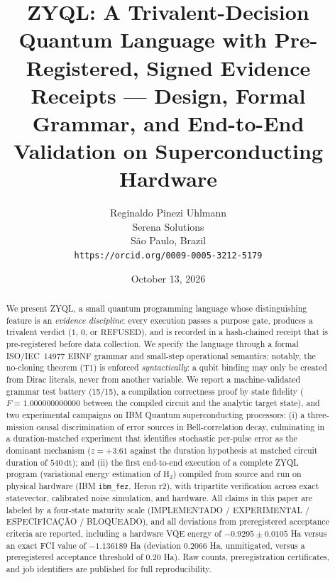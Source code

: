 \documentclass[11pt]{article}
\title{ZYQL: A Trivalent-Decision Quantum Language with Pre-Registered, Signed Evidence Receipts --- Design, Formal Grammar, and End-to-End Validation on Superconducting Hardware}
\author{Reginaldo Pinezi Uhlmann\\Serena Solutions\\S\~ao Paulo, Brazil\\\texttt{https://orcid.org/0009-0005-3212-5179}}
\date{October 13, 2026}
\begin{document}
\maketitle

\begin{abstract}
We present ZYQL, a small quantum programming language whose distinguishing feature is an \emph{evidence discipline}: every execution passes a purpose gate, produces a trivalent verdict ($1$, $0$, or $\mathrm{REFUSED}$), and is recorded in a hash-chained receipt that is pre-registered before data collection. We specify the language through a formal ISO/IEC~14977 EBNF grammar and small-step operational semantics; notably, the no-cloning theorem (T1) is enforced \emph{syntactically}: a qubit binding may only be created from Dirac literals, never from another variable. We report a machine-validated grammar test battery (15/15), a compilation correctness proof by state fidelity ($F = 1.000000000000$ between the compiled circuit and the analytic target state), and two experimental campaigns on IBM Quantum superconducting processors: (i) a three-mission causal discrimination of error sources in Bell-correlation decay, culminating in a duration-matched experiment that identifies stochastic per-pulse error as the dominant mechanism ($z = +3.61$ against the duration hypothesis at matched circuit duration of $540\,\mathrm{dt}$); and (ii) the first end-to-end execution of a complete ZYQL program (variational energy estimation of $\mathrm{H_2}$) compiled from source and run on physical hardware (IBM \texttt{ibm\_fez}, Heron r2), with tripartite verification across exact statevector, calibrated noise simulation, and hardware. All claims in this paper are labeled by a four-state maturity scale (IMPLEMENTADO / EXPERIMENTAL / ESPECIFICA\c{C}\~AO / BLOQUEADO), and all deviations from preregistered acceptance criteria are reported, including a hardware VQE energy of $-0.9295 \pm 0.0105$ Ha versus an exact FCI value of $-1.136189$ Ha (deviation $0.2066$ Ha, unmitigated, versus a preregistered acceptance threshold of $0.20$ Ha). Raw counts, preregistration certificates, and job identifiers are published for full reproducibility.
\end{abstract}
\end{document}
